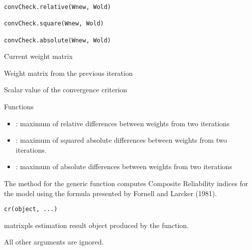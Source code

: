 \documentclass[a4paper]{book}
\begin{document}
%
\begin{Usage}
\begin{verbatim}
convCheck.relative(Wnew, Wold)

convCheck.square(Wnew, Wold)

convCheck.absolute(Wnew, Wold)
\end{verbatim}
\end{Usage}
%
\begin{Arguments}
\begin{ldescription}
\item[\code{Wnew}] Current weight matrix

\item[\code{Wold}] Weight matrix from the previous iteration
\end{ldescription}
\end{Arguments}
%
\begin{Value}
Scalar value of the convergence criterion
\end{Value}
%
\begin{Section}{Functions}
\begin{itemize}

\item{} : maximum of relative differences between
weights from two iterations

\item{} : maximum of squared absolute 
differences between weights from two iterations.

\item{} : maximum of absolute differences
between weights from two iterations

\end{itemize}
\end{Section}
%
\begin{Description}\relax
The  method for the generic function  computes Composite Reliability 
indices for the model using the formula presented by Fornell and Larcker (1981).
\end{Description}
%
\begin{Usage}
\begin{verbatim}
cr(object, ...)
\end{verbatim}
\end{Usage}
%
\begin{Arguments}
\begin{ldescription}
\item[\code{object}] matrixpls estimation result object produced by the  function.

\item[\code{...}] All other arguments are ignored.
\end{ldescription}
\end{Arguments}
\end{document}
